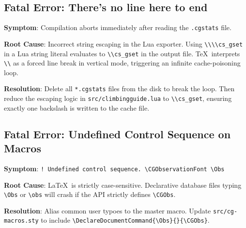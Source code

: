 \subsection{Fatal Error: There's no line here to end}
\textbf{Symptom}: Compilation aborts immediately after reading the \texttt{.cgstats} file.

\noindent\textbf{Root Cause}: Incorrect string escaping in the Lua exporter. Using \texttt{\textbackslash\textbackslash\textbackslash\textbackslash cs\_gset} in a Lua string literal evaluates to \texttt{\textbackslash\textbackslash cs\_gset} in the output file. \TeX\ interprets \texttt{\textbackslash\textbackslash} as a forced line break in vertical mode, triggering an infinite cache-poisoning loop.

\noindent\textbf{Resolution}: Delete all \texttt{*.cgstats} files from the disk to break the loop. Then reduce the escaping logic in \texttt{src/climbingguide.lua} to \texttt{\textbackslash\textbackslash cs\_gset}, ensuring exactly one backslash is written to the cache file.

\subsection{Fatal Error: Undefined Control Sequence on Macros}
\textbf{Symptom}: \texttt{! Undefined control sequence. \textbackslash CGObservationFont \textbackslash Obs}

\noindent\textbf{Root Cause}: \LaTeX\ is strictly case-sensitive. Declarative database files typing \texttt{\textbackslash Obs} or \texttt{\textbackslash obs} will crash if the API strictly defines \texttt{\textbackslash CGObs}.

\noindent\textbf{Resolution}: Alias common user typoes to the master macro. Update \texttt{src/cg-macros.sty} to include \texttt{\textbackslash DeclareDocumentCommand\{\textbackslash Obs\}\{\}\{\textbackslash CGObs\}}.

